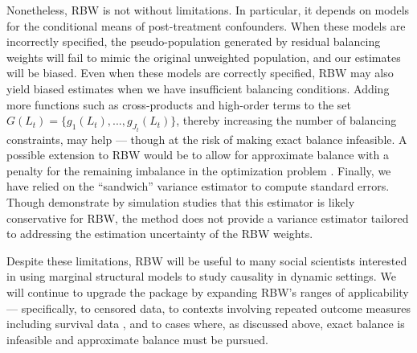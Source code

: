 Nonetheless, RBW is not without limitations. In particular, it depends
on models for the conditional means of post-treatment confounders. When
these models are incorrectly specified, the pseudo-population generated
by residual balancing weights will fail to mimic the original unweighted
population, and our estimates will be biased. Even when these models are
correctly specified, RBW may also yield biased estimates when we have
insufficient balancing conditions. Adding more functions such as
cross-products and high-order terms to the set
\(G(L_{t})=\{g_{1}(L_{t}),...,g_{J_{t}}(L_{t})\}\), thereby increasing
the number of balancing constraints, may help --- though at the risk of
making exact balance infeasible. A possible extension to RBW would be to
allow for approximate balance with a penalty for the remaining imbalance
in the optimization problem
\citep{fongCovariateBalancingPropensity2018}. Finally, we have relied on
the ``sandwich'' variance estimator to compute standard errors. Though
\citet{zhouResidualBalancingMethod2020a} demonstrate by simulation
studies that this estimator is likely conservative for RBW, the method
does not provide a variance estimator tailored to addressing the
estimation uncertainty of the RBW weights.

Despite these limitations, RBW will be useful to many social scientists
interested in using marginal structural models to study causality in
dynamic settings. We will continue to upgrade the package by expanding
RBW's ranges of applicability --- specifically, to censored data, to
contexts involving repeated outcome measures including survival data
\citep{hernanMarginalStructuralModels2000, hernanEstimatingCausalEffect2002},
and to cases where, as discussed above, exact balance is infeasible and
approximate balance must be pursued.



\address{%
Derick S. Baum\\
Harvard University\\%
Department of Sociology\\
%
%
%
\href{mailto:derick_baum@g.harvard.edu}{\nolinkurl{derick\_baum@g.harvard.edu}}%
}

\address{%
Xiang Zhou\\
Harvard University\\%
Department of Sociology\\
%
%
%
\href{mailto:xiang_zhou@fas.harvard.edu}{\nolinkurl{xiang\_zhou@fas.harvard.edu}}%
}
